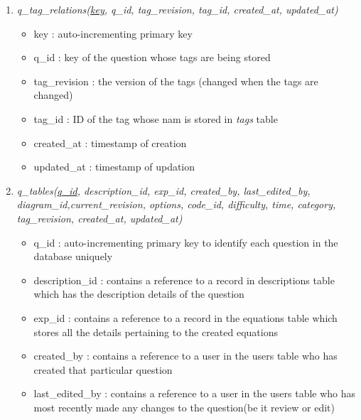 \documentclass[a4paper,12pt,oneside]{book}
\begin{document}
\begin{enumerate}
            \item \textit{q\_tag\_relations(\underline{key}, q\_id, tag\_revision, tag\_id, created\_at, updated\_at)}
                \begin{itemize}
                  \item key : auto-incrementing primary key
                  \item q\_id : key of the question whose tags are being stored
                  \item tag\_revision : the version of the tags (changed when the tags are changed)
                  \item tag\_id : ID of the tag whose nam is stored in \textit{tags} table
                  \item created\_at : timestamp of creation
                  \item updated\_at : timestamp of updation 
                \end{itemize}
                
            \item \textit{q\_tables(\underline{q\_id}, description\_id, exp\_id, created\_by, last\_edited\_by, diagram\_id,current\_revision, options, code\_id, difficulty, time, category, tag\_revision, created\_at, updated\_at)}
                \begin{itemize}
                  \item q\_id : auto-incrementing primary key to identify each question in the database uniquely
                  
                  \item description\_id : contains a reference to a record in descriptions table which has the description details of the question
                  
                  \item exp\_id : contains a reference to a record in the equations table which stores all the details pertaining to the created equations
                  
                  \item created\_by : contains a reference to a user in the users table who has created that particular question
                  
                  \item last\_edited\_by : contains a reference to a user in the users table who has most recently made any changes to the question(be it review or edit)
                  

\end{itemize}
\end{enumerate}
\end{document}
